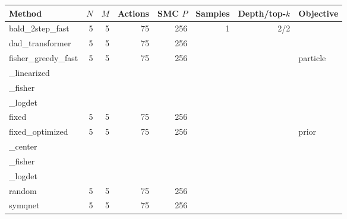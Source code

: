 \begin{tabular}{lrrrrrrl}
\toprule
Method & $N$ & $M$ & Actions & SMC $P$ & Samples & Depth/top-$k$ & Objective \\
\midrule
bald\_2step\_fast & 5 & 5 & 75 & 256 & 1 & 2/2 &  \\
dad\_transformer & 5 & 5 & 75 & 256 &  &  &  \\
fisher\_greedy\_fast & 5 & 5 & 75 & 256 &  &  & particle\\_linearized\\_fisher\\_logdet \\
fixed & 5 & 5 & 75 & 256 &  &  &  \\
fixed\_optimized & 5 & 5 & 75 & 256 &  &  & prior\\_center\\_fisher\\_logdet \\
random & 5 & 5 & 75 & 256 &  &  &  \\
symqnet & 5 & 5 & 75 & 256 &  &  &  \\
\bottomrule
\end{tabular}

